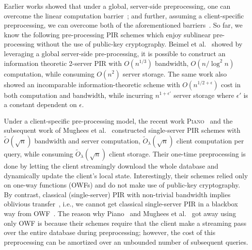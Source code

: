 Earlier works showed 
that under a global, server-side preprocessing, one can overcome
the linear computation barrier~\cite{bim-pir,sublinearpir,pir-ec22,pir-ec23,treepir,lazza-pir,shi-pir,weikai-depir,piano}; 
and further,
assuming a client-specific preprocessing, we can overcome 
both of the aforementioned barriers~\cite{piano,lingrenpir}. 
So far, we know the following pre-processing PIR schemes
which enjoy  
sublinear pre-processing  
without the use of public-key cryptography.  
Beimel et al.~\cite{bim-pir} showed 
by leveraging a global server-side pre-processing, 
it is possible to construct an 
information theoretic
2-server PIR with $O(n^{1/3})$ bandwidth, $O(n/\log^2 n)$
computation, while consuming $O(n^2)$ 
server storage. The same work also showed
an incomparable information-theoretic 
scheme with $O(n^{1/2 + \epsilon})$
cost in both computation and bandwidth, while incurring
$n^{1+\epsilon'}$
server storage where $\epsilon'$ is a constant dependent on $\epsilon$.

Under a client-specific pre-processing
model, the recent work \textsc{Piano}~\cite{piano} and the subsequent work of 
Mughees et al.~\cite{lingrenpir} constructed  
single-server PIR schemes with $\widetilde{O}(\sqrt{n})$
bandwidth and server computation, 
$\widetilde{O}_\lambda(\sqrt{n})$
client computation per query, 
while consuming $\widetilde{O}_\lambda(\sqrt{n})$ 
client storage.
Their one-time preprocessing is done by letting the client streamingly download the whole database and dynamically update the client's local state.
Interestingly, their schemes relied
only on one-way functions (OWFs)  
and do not make use of public-key cryptography.
By contrast, classical (single-server) PIR with non-trivial bandwidth implies
oblivious transfer~\cite{pirot}, 
i.e., we cannot get classical single-server PIR in a blackbox
way from OWF~\cite{IR89}.
The reason why Piano~\cite{piano}
 and Mughees et al.~\cite{lingrenpir}
got away using only OWF 
is because their schemes require that the client make a streaming pass  
over
the entire database during preprocessing;  however,
the cost of this preprocessing
can be amortized over an unbounded number of subsequent queries.


